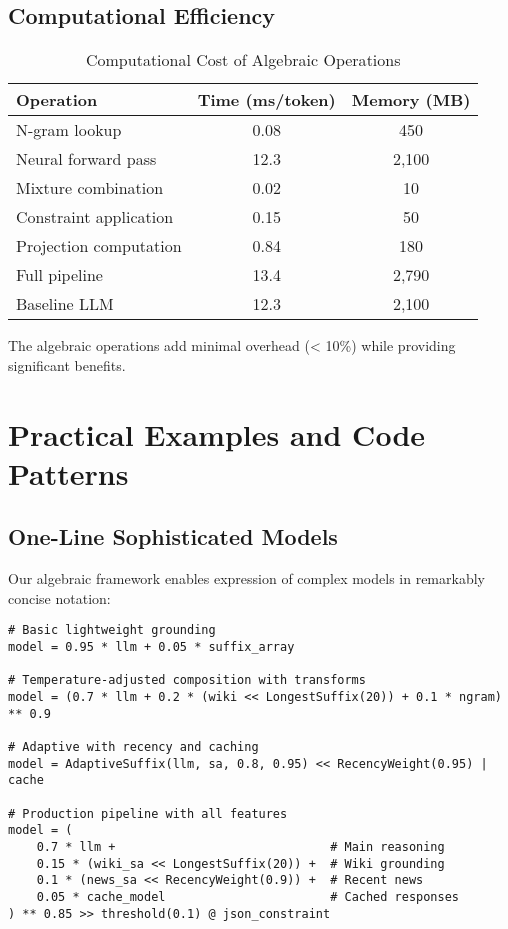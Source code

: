 \documentclass{article}
\theoremstyle{definition}
\begin{document}
\subsection{Computational Efficiency}

\begin{table}[h]
\centering
\caption{Computational Cost of Algebraic Operations}
\begin{tabular}{lcc}
\toprule
Operation & Time (ms/token) & Memory (MB) \\
\midrule
N-gram lookup & 0.08 & 450 \\
Neural forward pass & 12.3 & 2,100 \\
Mixture combination & 0.02 & 10 \\
Constraint application & 0.15 & 50 \\
Projection computation & 0.84 & 180 \\
\midrule
Full pipeline & 13.4 & 2,790 \\
Baseline LLM & 12.3 & 2,100 \\
\bottomrule
\end{tabular}
\end{table}

The algebraic operations add minimal overhead (< 10\%) while providing significant benefits.

\section{Practical Examples and Code Patterns}

\subsection{One-Line Sophisticated Models}

Our algebraic framework enables expression of complex models in remarkably concise notation:

\begin{lstlisting}
# Basic lightweight grounding
model = 0.95 * llm + 0.05 * suffix_array

# Temperature-adjusted composition with transforms
model = (0.7 * llm + 0.2 * (wiki << LongestSuffix(20)) + 0.1 * ngram) ** 0.9

# Adaptive with recency and caching
model = AdaptiveSuffix(llm, sa, 0.8, 0.95) << RecencyWeight(0.95) | cache

# Production pipeline with all features
model = (
    0.7 * llm +                              # Main reasoning
    0.15 * (wiki_sa << LongestSuffix(20)) +  # Wiki grounding
    0.1 * (news_sa << RecencyWeight(0.9)) +  # Recent news
    0.05 * cache_model                       # Cached responses
) ** 0.85 >> threshold(0.1) @ json_constraint
\end{lstlisting}
\end{document}
